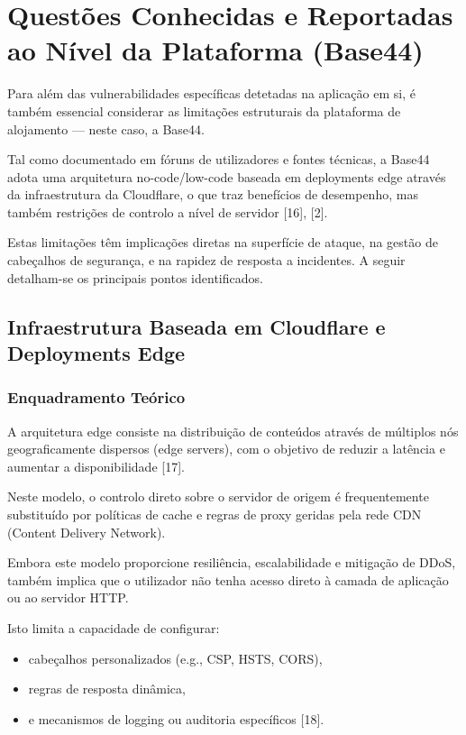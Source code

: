 \section{Questões Conhecidas e Reportadas ao Nível da Plataforma (Base44)}

Para além das vulnerabilidades específicas detetadas na aplicação em si, é também essencial considerar as limitações estruturais da plataforma de alojamento — neste caso, a Base44.

Tal como documentado em fóruns de utilizadores e fontes técnicas, a Base44 adota uma arquitetura no-code/low-code baseada em deployments edge através da infraestrutura da Cloudflare, o que traz benefícios de desempenho, mas também restrições de controlo a nível de servidor [16], [2].

Estas limitações têm implicações diretas na superfície de ataque, na gestão de cabeçalhos de segurança, e na rapidez de resposta a incidentes. A seguir detalham-se os principais pontos identificados.

\subsection{Infraestrutura Baseada em Cloudflare e Deployments Edge}

\subsubsection{Enquadramento Teórico}

A arquitetura edge consiste na distribuição de conteúdos através de múltiplos nós geograficamente dispersos (edge servers), com o objetivo de reduzir a latência e aumentar a disponibilidade [17].

Neste modelo, o controlo direto sobre o servidor de origem é frequentemente substituído por políticas de cache e regras de proxy geridas pela rede CDN (Content Delivery Network).

Embora este modelo proporcione resiliência, escalabilidade e mitigação de DDoS, também implica que o utilizador não tenha acesso direto à camada de aplicação ou ao servidor HTTP.

Isto limita a capacidade de configurar:

\begin{itemize}

\item cabeçalhos personalizados (e.g., CSP, HSTS, CORS),

\item regras de resposta dinâmica,

\item e mecanismos de logging ou auditoria específicos [18].

\end{itemize}

